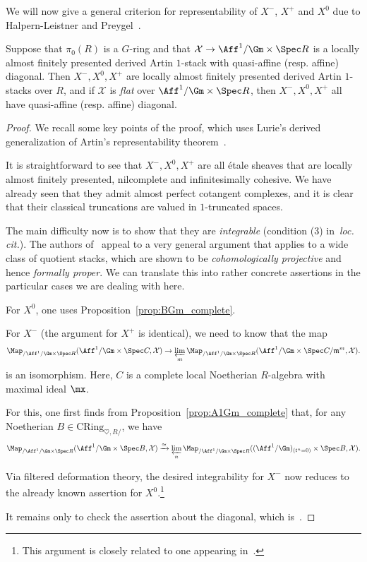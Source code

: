 \documentclass[10pt]{amsart}
\begin{document}
We will now give a general criterion for representability of $X^-$, $X^+$ and $X^0$ due to Halpern-Leistner and Preygel~\cite[Example 1.2.2]{MR4560539}.

\begin{proposition}
\label{prop:t-integrable_repble}
Suppose that $\pi_0(R)$ is a $G$-ring and that $\mathcal{X}\to \Aff^1/\Gm\times \Spec R$ is a locally almost finitely presented derived Artin $1$-stack with quasi-affine (resp. affine) diagonal. Then $X^-,X^0,X^+$ are locally almost finitely presented derived Artin $1$-stacks over $R$, and if $\mathcal{X}$ is \emph{flat} over $\Aff^1/\Gm\times\Spec R$, then $X^-,X^0,X^+$ all have quasi-affine (resp. affine) diagonal.
\end{proposition}
\begin{proof}
We recall some key points of the proof, which uses Lurie's derived generalization of Artin's representability theorem~\cite[Theorem 7.1.6]{lurie_thesis}. 

It is straightforward to see that $X^-,X^0,X^+$ are all \'etale sheaves that are locally almost finitely presented, nilcomplete and infinitesimally cohesive. We have already seen that they admit almost perfect cotangent complexes, and it is clear that their classical truncations are valued in $1$-truncated spaces. 

The main difficulty now is to show that they are \emph{integrable} (condition (3) in~\emph{loc. cit.}). The authors of~\cite{MR4560539} appeal to a very general argument that applies to a wide class of quotient stacks, which are shown to be \emph{cohomologically projective} and hence \emph{formally proper}. We can translate this into rather concrete assertions in the particular cases we are dealing with here. 

For $X^0$, one uses Proposition~\ref{prop:BGm_complete}.

For $X^-$ (the argument for $X^+$ is identical), we need to know that the map
\begin{align}\label{eqn:attractor_integrability_map}
\Map_{/\Aff^1/\Gm\times \Spec R}(\Aff^1/\Gm \times \Spec C,\mathcal{X})\to\varprojlim_m\Map_{/\Aff^1/\Gm\times \Spec R}(\Aff^1/\Gm \times \Spec C/\mathfrak{m}^m,\mathcal{X}).
\end{align}
is an isomorphism. Here, $C$ is a complete local Noetherian $R$-algebra with maximal ideal $\mx$. 

For this, one first finds from Proposition~\ref{prop:A1Gm_complete} that, for any Noetherian $B\in \mathrm{CRing}_{\heartsuit,R/}$, we have
\[
\Map_{/\Aff^1/\Gm\times \Spec R}(\Aff^1/\Gm \times \Spec B,\mathcal{X})\xrightarrow{\simeq}\varprojlim_n\Map_{/\Aff^1/\Gm\times \Spec R}((\Aff^1/\Gm)_{(t^n=0)} \times \Spec B,\mathcal{X}).
\]


Via filtered deformation theory, the desired integrability for $X^-$ now reduces to the already known assertion for $X^0$.\footnote{This argument is closely related to one appearing in~\cite{drinfeld2015algebraic}.}

It remains only to check the assertion about the diagonal, which is~\cite[Proposition 5.1.15]{MR4560539}.
\end{proof}
\end{document}

